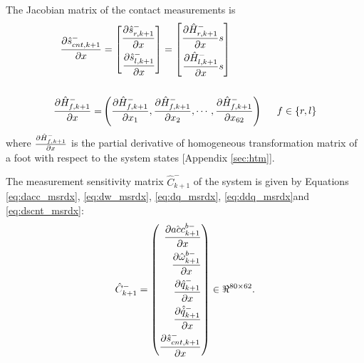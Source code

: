 \begin{enumerate}
 The Jacobian matrix of the contact measurements is 
\begin{equation}
    \label{eq:dscnt_msrdx}
    \begin{split}
    \dfdx{\hat{s}_{cnt,k+1}^-}{x} &= \left[
    \begin{aligned}
    \dfdx{\hat{s}_{r,k+1}^-}{x}  \\ \dfdx{\hat{s}_{l,k+1}^-}{x}
    \end{aligned} \right] = \left[
    \begin{aligned}
    \dfdx{\hat{H}_{r,k+1}^-}{x}s \\ \dfdx{\hat{H}_{l,k+1}^-}{x}s 
    \end{aligned}\right]
 \\ \vspace{5mm} \\
     \dfdx{\hat{H}_{f,k+1}^-}{x} = &\left( \dfdx{\hat{H}_{f,k+1}^-}{x_1}, \dfdx{\hat{H}_{f,k+1}^-}{x_2},\cdots, \dfdx{\hat{H}_{f,k+1}^-}{x_{62}} \right) \hspace{5mm} f \in \{r,l\}
     \end{split}
\end{equation}
where $\frac{\partial {\hat{H}_{f,k+1}^-}}{\partial {x}}$ is the partial derivative of homogeneous transformation matrix of a foot with respect to the system states [Appendix \ref{sec:htm}].
\end{enumerate}
The measurement sensitivity matrix $\hat{C}_{k+1}^-$ of the system is given by Equations \ref{eq:dacc_msrdx}, \ref{eq:dw_msrdx}, \ref{eq:dq_msrdx}, \ref{eq:ddq_msrdx}and \ref{eq:dscnt_msrdx}:
\begin{equation}
    \label{eq:msr_mat}
    \hat{C}^-_{k+1} = \left(
   \begin{aligned}
   \frac{\partial {\hat{acc}_{k+1}^{b-}}}{\partial {x}} \\
   \frac{\partial {\hat{\omega}^{b-}_{k+1}}}{\partial {x}} \\
    \frac{\partial {\hat{q}_{k+1}^-}}{\partial {x}} \\
    \frac{\partial {\hat{\dot{q}}_{k+1}^-}}{\partial {x}} \\
    \frac{\partial {\hat{s}_{cnt,k+1}^-}}{\partial {x}} \\
   \end{aligned}
	 \right) \in \Re^{80 \times 62}.
\end{equation}

